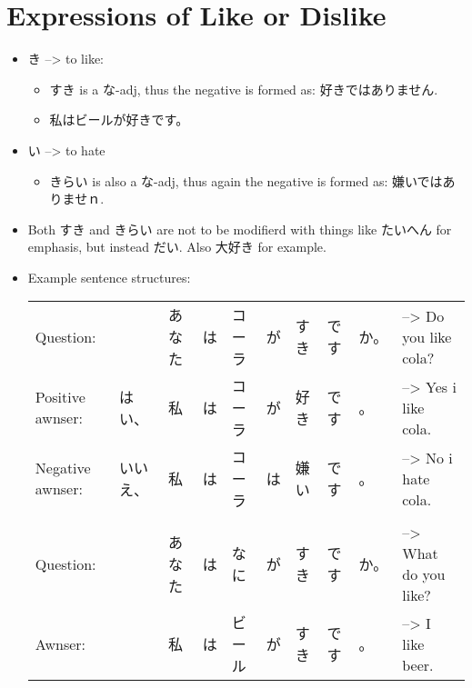 \documentclass{article}
\newcommand\tab[1][1cm]{\hspace*{#1}}
\begin{document}
\section{Expressions of Like or Dislike}
\begin{itemize}
\item {}き --> to like:
\begin{itemize}
\item すき is a な-adj, thus the negative is formed as: 好きではありません.
\item 私はビールが好きです。
\end{itemize}
\item {}い --> to hate %
\begin{itemize}
\item きらい is also a な-adj, thus again the negative is formed as: 嫌いではありませｎ.
\end{itemize}
\item Both すき and きらい are not to be modifierd with things like たいへん for emphasis, but instead だい. Also 大好き for example.
\item Example sentence structures:\\
\begin{tabular}{ l l l l l l l l l l }
Question:&&あなた&は&コーラ&\color{orange}が&すき&です&か。& --> Do you like cola? \\
Positive awnser:&はい、&私&は&コーラ&\color{orange}が&好き&です&。& --> Yes i like cola. \\
Negative awnser:&いいえ、&私&は&コーラ&\color{blue}は&嫌い&です&。& --> No i hate cola. \\ \\
Question:&&あなた&は&なに&\color{orange}が&すき&です&か。& --> What do you like? \\
Awnser:&&私&は&ビール&\color{orange}が&すき&です&。& --> I like beer. \\
\end{tabular}
\end{itemize}
\end{document}

